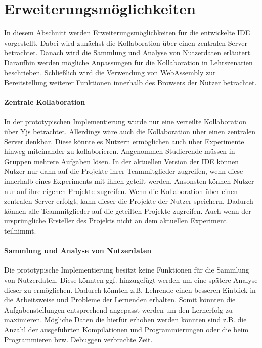 \section{Erweiterungsmöglichkeiten}\label{section:diskussion:erweiterungsmöglichkeiten}
In diesem Abschnitt werden Erweiterungsmöglichkeiten für die entwickelte IDE vorgestellt. Dabei wird zunächst die Kollaboration über einen zentralen Server betrachtet. Danach wird die Sammlung und Analyse von Nutzerdaten erläutert. Daraufhin werden mögliche Anpassungen für die Kollaboration in Lehrszenarien beschrieben. Schließlich wird die Verwendung von WebAssembly \cite{noauthor_webassembly_nodate} zur Bereitstellung weiterer Funktionen innerhalb des Browsers der Nutzer betrachtet.

\paragraph{Zentrale Kollaboration}
In der prototypischen Implementierung wurde nur eine verteilte Kollaboration über Yjs betrachtet. Allerdings wäre auch die Kollaboration über einen zentralen Server denkbar. Diese könnte es Nutzern ermöglichen auch über Experimente hinweg miteinander zu kollaborieren. Angenommen Studierende müssen in Gruppen mehrere Aufgaben lösen. In der aktuellen Version der IDE können Nutzer nur dann auf die Projekte ihrer Teammitglieder zugreifen, wenn diese innerhalb eines Experiments mit ihnen geteilt werden. Ansonsten können Nutzer nur auf ihre eigenen Projekte zugreifen. Wenn die Kollaboration über einen zentralen Server erfolgt, kann dieser die Projekte der Nutzer speichern. Dadurch können alle Teammitglieder auf die geteilten Projekte zugreifen. Auch wenn der ursprüngliche Ersteller des Projekts nicht an dem aktuellen Experiment teilnimmt.

\paragraph{Sammlung und Analyse von Nutzerdaten}
Die prototypische Implementierung besitzt keine Funktionen für die Sammlung von Nutzerdaten. Diese könnten ggf. hinzugefügt werden um eine spätere Analyse dieser zu ermöglichen. Dadurch könnten z.B. Lehrende einen besseren Einblick in die Arbeitsweise und Probleme der Lernenden erhalten. Somit könnten die Aufgabenstellungen entsprechend angepasst werden um den Lernerfolg zu maximieren. Mögliche Daten die hierfür erhoben werden könnten sind z.B. die Anzahl der ausgeführten Kompilationen und Programmierungen oder die beim Programmieren bzw. Debuggen verbrachte Zeit.

